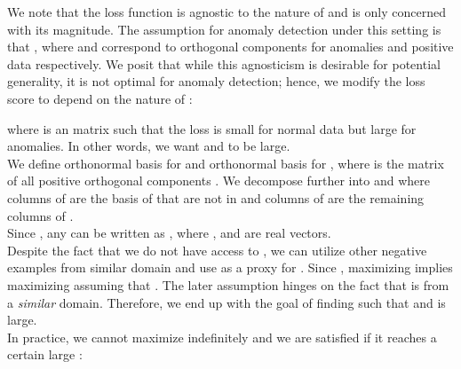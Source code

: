 \documentclass[acmtog, nonacm]{acmart}
\begin{document}
We note that the loss function is agnostic to the nature of  and is only concerned with its magnitude. The assumption for anomaly detection under this setting is that , where  and  correspond to orthogonal components for anomalies and positive data respectively. We posit that while this agnosticism is desirable for potential generality, it is not optimal for anomaly detection; hence, we modify the loss score to depend on the nature of :

where  is an  matrix such that the loss is small for normal data but large for anomalies. In other words, we want  and  to be large. \\
We define  orthonormal basis for  and  orthonormal basis for , where  is the matrix of all positive orthogonal components .
We decompose  further into  and  where columns of  are the basis of  that are not in  and columns of  are the remaining columns of .
\\
Since , any  can be written as , where ,  and  are real vectors.\\
Despite the fact that we do not have access to , we can utilize other negative examples from similar domain and use  as a proxy for . Since , maximizing  implies maximizing  assuming that . The later assumption hinges on the fact that  is from a \textit{similar} domain. Therefore, we end up with the goal of finding  such that  and  is large.\\

\noindent
In practice, we cannot maximize  indefinitely and we are satisfied if it reaches a 
certain large :
\end{document}

